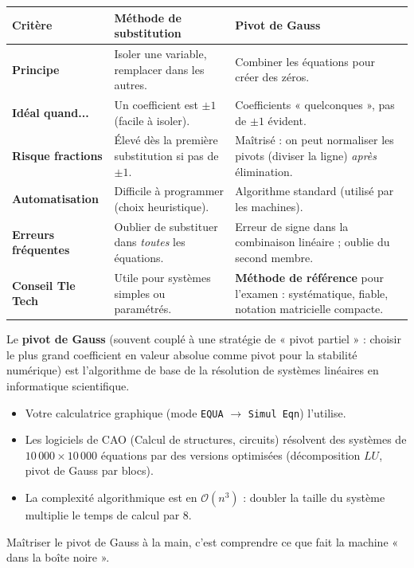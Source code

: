 \documentclass[11pt]{article}
\begin{document}
\begin{center}
\begin{tabularx}{\linewidth}{|l|X|X|}
\hline
\rowcolor{popblueL}
\textbf{Critère} & \textbf{Méthode de substitution} & \textbf{Pivot de Gauss} \\
\hline
\textbf{Principe} & Isoler une variable, remplacer dans les autres. & Combiner les équations pour créer des zéros. \\
\hline
\textbf{Idéal quand...} & Un coefficient est $\pm 1$ (facile à isoler). & Coefficients « quelconques », pas de $\pm 1$ évident. \\
\hline
\textbf{Risque fractions} & Élevé dès la première substitution si pas de $\pm 1$. & Maîtrisé : on peut normaliser les pivots (diviser la ligne) \emph{après} élimination. \\
\hline
\textbf{Automatisation} & Difficile à programmer (choix heuristique). & Algorithme standard (utilisé par les machines). \\
\hline
\textbf{Erreurs fréquentes} & Oublier de substituer dans \emph{toutes} les équations. & Erreur de signe dans la combinaison linéaire ; oublie du second membre. \\
\hline
\textbf{Conseil Tle Tech} & Utile pour systèmes simples ou paramétrés. & \textbf{Méthode de référence} pour l'examen : systématique, fiable, notation matricielle compacte. \\
\hline
\end{tabularx}
\end{center}

\begin{savaistu}
Le \textbf{pivot de Gauss} (souvent couplé à une stratégie de « pivot partiel » : choisir le plus grand coefficient en valeur absolue comme pivot pour la stabilité numérique) est l'algorithme de base de la résolution de systèmes linéaires en informatique scientifique.
\begin{itemize}
    \item Votre calculatrice graphique (mode \texttt{EQUA} $\to$ \texttt{Simul Eqn}) l'utilise.
    \item Les logiciels de CAO (Calcul de structures, circuits) résolvent des systèmes de $10\,000 \times 10\,000$ équations par des versions optimisées (décomposition $LU$, pivot de Gauss par blocs).
    \item La complexité algorithmique est en $\mathcal{O}(n^3)$ : doubler la taille du système multiplie le temps de calcul par 8.
\end{itemize}
Maîtriser le pivot de Gauss à la main, c'est comprendre ce que fait la machine « dans la boîte noire ».
\end{savaistu}
\end{document}
